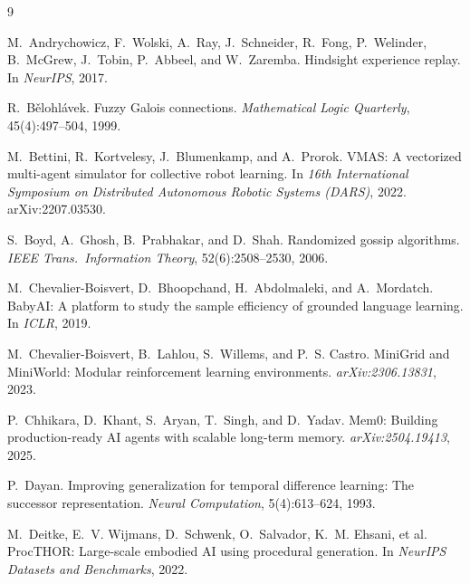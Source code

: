 \documentclass{article}
\begin{document}
{\small
\begin{thebibliography}{9}

M.~Andrychowicz, F.~Wolski, A.~Ray, J.~Schneider, R.~Fong, P.~Welinder, B.~McGrew, J.~Tobin, P.~Abbeel, and W.~Zaremba.
\newblock Hindsight experience replay.
\newblock In \emph{NeurIPS}, 2017.

R.~B\v{e}lohl\'avek.
\newblock Fuzzy Galois connections.
\newblock \emph{Mathematical Logic Quarterly}, 45(4):497--504, 1999.

M.~Bettini, R.~Kortvelesy, J.~Blumenkamp, and A.~Prorok.
\newblock VMAS: A vectorized multi-agent simulator for collective robot learning.
\newblock In \emph{16th International Symposium on Distributed Autonomous Robotic Systems (DARS)}, 2022.
\newblock arXiv:2207.03530.

S.~Boyd, A.~Ghosh, B.~Prabhakar, and D.~Shah.
\newblock Randomized gossip algorithms.
\newblock \emph{IEEE Trans.\ Information Theory}, 52(6):2508--2530, 2006.

M.~Chevalier-Boisvert, D.~Bhoopchand, H.~Abdolmaleki, and A.~Mordatch.
\newblock BabyAI: A platform to study the sample efficiency of grounded language learning.
\newblock In \emph{ICLR}, 2019.

M.~Chevalier-Boisvert, B.~Lahlou, S.~Willems, and P.~S. Castro.
\newblock MiniGrid and MiniWorld: Modular reinforcement learning environments.
\newblock \emph{arXiv:2306.13831}, 2023.

P.~Chhikara, D.~Khant, S.~Aryan, T.~Singh, and D.~Yadav.
\newblock Mem0: Building production-ready AI agents with scalable long-term memory.
\newblock \emph{arXiv:2504.19413}, 2025.

P.~Dayan.
\newblock Improving generalization for temporal difference learning: The successor representation.
\newblock \emph{Neural Computation}, 5(4):613--624, 1993.

M.~Deitke, E.~V. Wijmans, D.~Schwenk, O.~Salvador, K.~M. Ehsani, et al.
\newblock ProcTHOR: Large-scale embodied AI using procedural generation.
\newblock In \emph{NeurIPS Datasets and Benchmarks}, 2022.


\end{thebibliography}}
\end{document}
